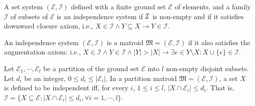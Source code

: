 \begin{definition}\label{def:IS}
A set system $(\mathcal{E},\mathcal{I})$ defined with a finite ground set $\mathcal{E}$ of elements, and a family $\mathcal{I}$ of subsets of $\mathcal{E}$ is an independence system if $\mbox{$\mathcal{I}$}$ is non-empty and if it satisfies downward closure axiom, i.e.,
$X \in \mathcal{I} \wedge Y \subseteq X \rightarrow Y \in \mathcal{I}$.


\end{definition}

\begin{definition}[Matroid]\label{def:Matroid}
An independence system $(\mathcal{E}, \mathcal{I})$ is a matroid $\mathfrak{M} = (\mathcal{E}, \mathcal{I})$ if it also satisfies the augmentation axiom: i.e.,
$X \in \mathcal{I} \wedge Y \in \mathcal{I} \wedge |Y| > |X| \rightarrow \exists e \in Y \setminus X : X \cup \{e\} \in \mathcal{I}$.
\end{definition}

\begin{definition}\label{def:PartitionMatroid}
Let $\mathcal{E}_1, \cdots, \mathcal{E}_l$ be a partition of the ground set $\mathcal{E}$ into $l$ non-empty disjoint subsets. Let $d_i$ be an integer, $0 \le d_i \le |\mathcal{E}_i|$. In a partition matroid $\mathfrak{M} = (\mathcal{E}, \mathcal{I})$, a set $X$ is defined to be independent iff, for every $i$, $1\le i\le l$, $|X \cap \mathcal{E}_i| \le d_i$. That is, $\mathcal{I} = \{X \subseteq \mathcal{E} : |X \cap \mathcal{E}_i| \le d_i, \forall i = 1,\cdots,l \}$.
\end{definition}

